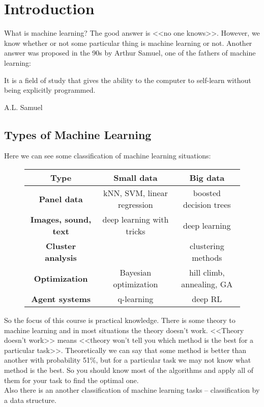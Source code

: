 \chapter{Introduction}

{\sf What is machine learning? The good answer is <<no one knows>>. However, we know whether or not some particular thing is machine learning or not. Another answer was proposed in the 90s by Arthur Samuel, one of the fathers of machine learning:
\begin{displayquote}
  \glqq It is a field of study that gives the ability to the computer to self-learn without being explicitly programmed.\grqq
  \begin{flushright}
  	A.L. Samuel
  \end{flushright}
\end{displayquote}
}

\section{Types of Machine Learning}

Here we can see some classification of machine learning situations:
\begingroup
	\def\arraystretch{2}
	\begin{figure}[H]
		\centering
		\begin{tabular}{|c|c|c|} 
			\hline
			{\bf Type} & {\bf Small data} & {\bf Big data} \\
			\hline
			{\bf Panel data} & kNN, SVM, linear regression & boosted decision trees \\
 			\hline
 			{\bf Images, sound, text} & deep learning with tricks & deep learning \\
	 		\hline
	 		{\bf Cluster analysis} &  & clustering methods \\
	 		\hline
	 		{\bf Optimization} & Bayesian optimization & hill climb, annealing, GA\\
	 		\hline
	 		{\bf Agent systems} & q-learning & deep RL \\
 			\hline
		\end{tabular}
	\end{figure}
\endgroup
So the focus of this course is practical knowledge. There is some theory to machine learning and in most situations the theory doesn't work. <<Theory doesn't work>> means <<theory won't tell you which method is the best for a particular task>>. Theoretically we can say that some method is better than another with probability 51\%, but for a particular task we may not know what method is the best. So you should know most of the algorithms and apply all of them for your task to find the optimal one.\\
Also there is an another classification of machine learning tasks -- classification by a data structure.

